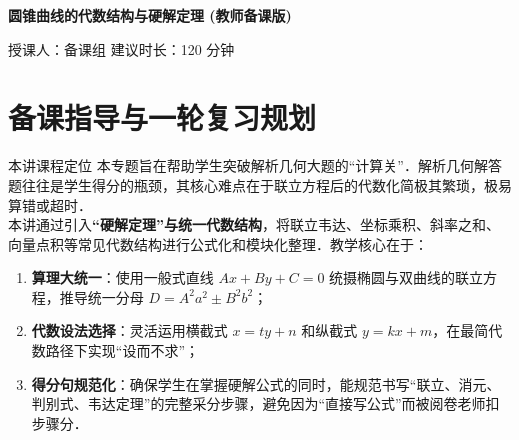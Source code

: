 \documentclass[11pt,a4paper]{ctexart}
\newcommand{\lessoninfo}[2]{%
  \begin{center}
    {\LARGE\bfseries #1 \quad (教师备课版)}\par
    \vspace{0.8em}
    {\small 授课人：#2 \quad 建议时长：120 分钟}
  \end{center}
  \vspace{0.6em}
}
\begin{document}
\lessoninfo{圆锥曲线的代数结构与硬解定理}{备课组}

\section{备课指导与一轮复习规划}

\begin{teachbox}{本讲课程定位}
本专题旨在帮助学生突破解析几何大题的“计算关”．解析几何解答题往往是学生得分的瓶颈，其核心难点在于联立方程后的代数化简极其繁琐，极易算错或超时．\\
本讲通过引入\textbf{“硬解定理”与统一代数结构}，将联立韦达、坐标乘积、斜率之和、向量点积等常见代数结构进行公式化和模块化整理．教学核心在于：
\begin{enumerate}
  \item \textbf{算理大统一}：使用一般式直线 $Ax+By+C=0$ 统摄椭圆与双曲线的联立方程，推导统一分母 $D = A^2a^2 \pm B^2b^2$；
  \item \textbf{代数设法选择}：灵活运用横截式 $x=ty+n$ 和纵截式 $y=kx+m$，在最简代数路径下实现“设而不求”；
  \item \textbf{得分句规范化}：确保学生在掌握硬解公式的同时，能规范书写“联立、消元、判别式、韦达定理”的完整采分步骤，避免因为“直接写公式”而被阅卷老师扣步骤分．
\end{enumerate}
\end{teachbox}
\end{document}
